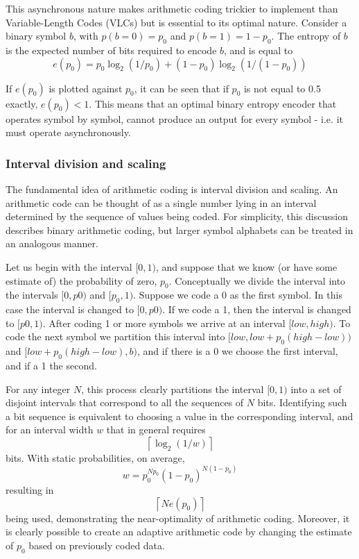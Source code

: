 \begin{informative*}
This asynchronous nature makes arithmetic coding trickier to implement 
than Variable-Length Codes (VLCs) but is essential to its optimal nature. Consider
a binary symbol $b$, with $p(b=0)=p_0$ and $p(b=1)=1-p_0$. The entropy of $b$
is the expected number of bits required to encode $b$, and is equal to
\[e(p_0)=p_0\log_2(1/p_0)+(1-p_0)\log_2(1/(1-p_0))\]

If $e(p_0)$ is plotted against $p_0$, it can be seen that if $p_0$ is not equal
to 0.5 exactly, $e(p_0)<1$. This means that an optimal binary entropy encoder
that operates symbol by symbol, cannot produce an output for every symbol - i.e.
it must operate asynchronously.

\subsubsection{Interval division and scaling}
The fundamental idea of arithmetic coding is interval division and scaling. An
arithmetic code can be thought of as a single number lying in an interval 
determined by the sequence of values being coded. For simplicity, this discussion
describes binary arithmetic coding, but larger symbol alphabets can be treated
in an analogous manner.

Let us begin with the interval $[0,1)$, and suppose that we know (or have some 
estimate of) the probability of zero, $p_0$. Conceptually we divide the interval
into the intervals $[0,p0)$ and $[p_0,1)$. Suppose we code a 0 as the
first symbol. In this case the interval is changed to $[0,p0)$. If we code a 1,
then the interval is changed to $[p0,1)$. After coding 1 or more symbols we 
arrive at an interval $[low,high)$. To code the next symbol we partition this interval
into $[low,low+p_0(high-low))$ and $[low+p_0(high-low),b)$, and if there is a 0 we choose the
first interval, and if a 1 the second.

For any integer $N$, this process clearly partitions the interval $[0,1)$ into 
a set of disjoint intervals that correspond to all the sequences of $N$ bits.
Identifying such a bit sequence is equivalent to choosing a value in the 
corresponding interval, and for an interval width $w$ that in general requires 
\[\left\lceil\log_2(1/w)\right\rceil\]
bits. With static probabilities, on average,
\[w=p_0^{Np_0}(1-p_0)^{N(1-p_0)}\]
resulting in 
\[\left\lceil Ne(p_0)\right\rceil\]
being used, demonstrating the near-optimality of arithmetic coding.
Moreover, it is clearly possible to create an adaptive arithmetic code by
changing the estimate of $p_0$ based on previously coded data.


\end{informative*}
